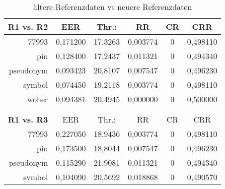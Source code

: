 \begin{table}[htbp]
  \centering
  \caption{\"altere Referenzdaten vs neuere Referenzdaten}
    \begin{tabular}{rrrrrr}
    \toprule
    \textbf{R1 vs. R2} & \multicolumn{1}{c}{EER} & \multicolumn{1}{c}{Thr.:} & \multicolumn{1}{c}{RR} & \multicolumn{1}{c}{CR} & \multicolumn{1}{c}{CRR} \\
    \midrule
    77993 & \multicolumn{1}{c}{0,171200} & \multicolumn{1}{c}{17,3263} & \multicolumn{1}{c}{0,003774} & \multicolumn{1}{c}{0} & \multicolumn{1}{c}{0,498110} \\
    pin   & \multicolumn{1}{c}{0,128400} & \multicolumn{1}{c}{17,2437} & \multicolumn{1}{c}{0,011321} & \multicolumn{1}{c}{0} & \multicolumn{1}{c}{0,494340} \\
    pseudonym & \multicolumn{1}{c}{0,093423} & \multicolumn{1}{c}{20,8107} & \multicolumn{1}{c}{0,007547} & \multicolumn{1}{c}{0} & \multicolumn{1}{c}{0,496230} \\
    symbol & \multicolumn{1}{c}{0,074450} & \multicolumn{1}{c}{19,2118} & \multicolumn{1}{c}{0,003774} & \multicolumn{1}{c}{0} & \multicolumn{1}{c}{0,498110} \\
    woher & \multicolumn{1}{c}{0,094381} & \multicolumn{1}{c}{20,4945} & \multicolumn{1}{c}{0,000000} & \multicolumn{1}{c}{0} & \multicolumn{1}{c}{0,500000} \\
          &       &       &       &       &  \\
          &       &       &       &       &  \\
    \textbf{R1 vs. R3} & \multicolumn{1}{c}{EER} & \multicolumn{1}{c}{Thr.:} & \multicolumn{1}{c}{RR} & \multicolumn{1}{c}{CR} & \multicolumn{1}{c}{CRR} \\
    77993 & \multicolumn{1}{c}{0,227050} & \multicolumn{1}{c}{18,9436} & \multicolumn{1}{c}{0,003774} & \multicolumn{1}{c}{0} & \multicolumn{1}{c}{0,498110} \\
    pin   & \multicolumn{1}{c}{0,173500} & \multicolumn{1}{c}{18,8044} & \multicolumn{1}{c}{0,007547} & \multicolumn{1}{c}{0} & \multicolumn{1}{c}{0,496230} \\
    pseudonym & \multicolumn{1}{c}{0,115290} & \multicolumn{1}{c}{21,9081} & \multicolumn{1}{c}{0,011321} & \multicolumn{1}{c}{0} & \multicolumn{1}{c}{0,494340} \\
    symbol & \multicolumn{1}{c}{0,104090} & \multicolumn{1}{c}{20,5692} & \multicolumn{1}{c}{0,018868} & \multicolumn{1}{c}{0} & \multicolumn{1}{c}{0,490570} \\

\end{tabular}
\end{table}
